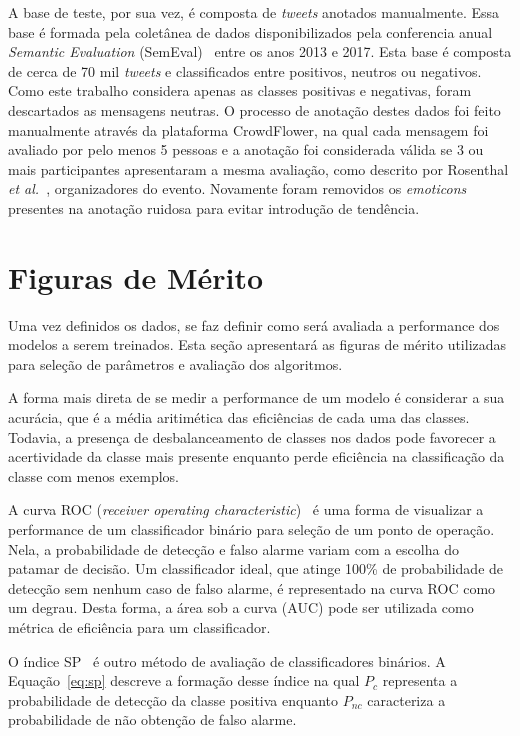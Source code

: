 A base de teste, por sua vez, é composta de \textit{tweets} anotados manualmente.
Essa base é formada pela coletânea de dados disponibilizados pela conferencia anual \textit{Semantic Evaluation}
(SemEval)~\cite{semeval17} entre os anos 2013 e 2017.
Esta base é composta de cerca de 70 mil \textit{tweets} e classificados entre positivos, neutros ou negativos.
Como este trabalho considera apenas as classes positivas e negativas, foram descartados as mensagens neutras.
O processo de anotação destes dados foi feito manualmente através da plataforma CrowdFlower, na qual cada mensagem
foi avaliado por pelo menos 5 pessoas e a anotação foi considerada válida se 3 ou mais participantes apresentaram a
mesma avaliação, como descrito por Rosenthal \textit{et al.}~\cite{rosenthal17}, organizadores do evento.
Novamente foram removidos os \textit{emoticons} presentes na anotação ruidosa para evitar introdução de tendência.

\section{Figuras de Mérito} \label{sec:metrics}

Uma vez definidos os dados, se faz definir como será avaliada a performance dos modelos a serem treinados.
Esta seção apresentará as figuras de mérito utilizadas para seleção de parâmetros e avaliação dos algoritmos.

A forma mais direta de se medir a performance de um modelo é considerar a sua acurácia, que é a média aritimética das
eficiências de cada uma das classes.
Todavia, a presença de desbalanceamento de classes nos dados pode favorecer a acertividade da classe mais presente
enquanto perde eficiência na classificação da classe com menos exemplos.

A curva ROC (\textit{receiver operating characteristic})~\cite{bradley97} é uma forma de visualizar a performance de um
classificador binário para seleção de um ponto de operação.
Nela, a probabilidade de detecção e falso alarme variam com a escolha do patamar de decisão.
Um classificador ideal, que atinge 100\% de probabilidade de detecção sem nenhum caso de falso alarme, é representado na
curva ROC como um degrau.
Desta forma, a área sob a curva (AUC) pode ser utilizada como métrica de eficiência para um classificador.

O índice SP~\cite{ciodaro12} é outro método de avaliação de classificadores binários.
A Equação~\ref{eq:sp} descreve a formação desse índice na qual $P_c$ representa a probabilidade de detecção da classe
positiva enquanto $P_{nc}$ caracteriza a probabilidade de não obtenção de falso alarme.

